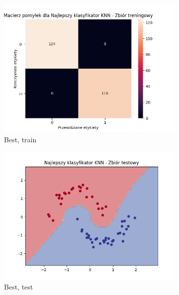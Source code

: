 \documentclass[12pt]{article}
\newcommand*{\subfigwidth}{0.24\textwidth}
\begin{document}
\begin{figure}[H]
\begin{subfigure}[t]{\subfigwidth}
        \includegraphics[width=\linewidth]{img/exp_2/knn/2_2/best/train_matrix.png}
        \caption{Best, train}
    \end{subfigure}
    \hfill
    \begin{subfigure}[t]{\subfigwidth}
        \includegraphics[width=\linewidth]{img/exp_2/knn/2_2/best/test_boundary.png}
        \caption{Best, test}
    \end{subfigure}
    \hfill
    \begin{subfigure}[t]{\subfigwidth}

\end{subfigure}
\end{figure}
\end{document}
